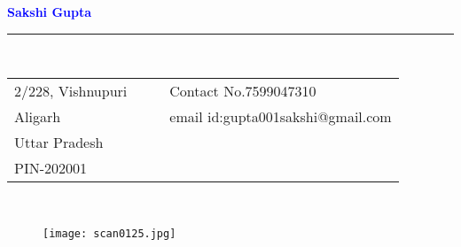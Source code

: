 \documentclass[10pt]{article}
\begin{document}
 
	\begin{center}
		\textbf{\large\textcolor{blue}{Sakshi Gupta}}
		
	\end{center}
	\rule[5pt]{\textwidth}{0.5mm}\\
	\begin{tabular}{l c c l}
		2/228, Vishnupuri & & & \qquad \qquad  \qquad \qquad \qquad \qquad \qquad Contact No.7599047310\\
		Aligarh & &  & \qquad \qquad \qquad \qquad \qquad \qquad \qquad email id:gupta001sakshi@gmail.com\\
		Uttar Pradesh\\
		PIN-202001\\
		\end {tabular}\\
		\begin{figure}[h]
			\begin{flushright}
     	    \texttt{[image: scan0125.jpg]}
			\end{flushright}
		\end{figure}
\end{document}
